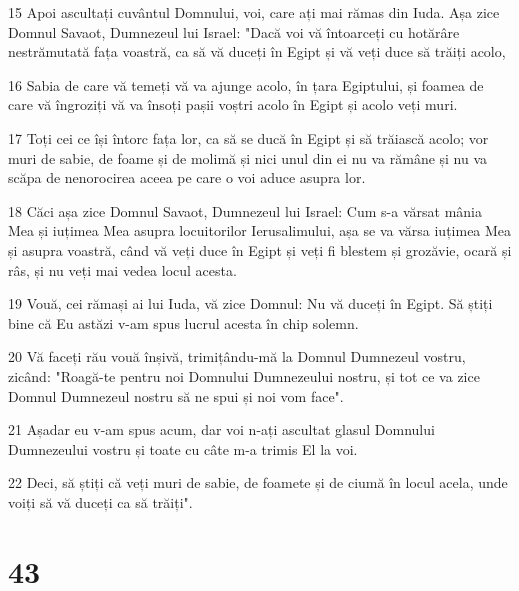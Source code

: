\par 15 Apoi ascultați cuvântul Domnului, voi, care ați mai rămas din Iuda. Așa zice Domnul Savaot, Dumnezeul lui Israel: "Dacă voi vă întoarceți cu hotărâre nestrămutată fața voastră, ca să vă duceți în Egipt și vă veți duce să trăiți acolo,
\par 16 Sabia de care vă temeți vă va ajunge acolo, în țara Egiptului, și foamea de care vă îngroziți vă va însoți pașii voștri acolo în Egipt și acolo veți muri.
\par 17 Toți cei ce își întorc fața lor, ca să se ducă în Egipt și să trăiască acolo; vor muri de sabie, de foame și de molimă și nici unul din ei nu va rămâne și nu va scăpa de nenorocirea aceea pe care o voi aduce asupra lor.
\par 18 Căci așa zice Domnul Savaot, Dumnezeul lui Israel: Cum s-a vărsat mânia Mea și iuțimea Mea asupra locuitorilor Ierusalimului, așa se va vărsa iuțimea Mea și asupra voastră, când vă veți duce în Egipt și veți fi blestem și grozăvie, ocară și râs, și nu veți mai vedea locul acesta.
\par 19 Vouă, cei rămași ai lui Iuda, vă zice Domnul: Nu vă duceți în Egipt. Să știți bine că Eu astăzi v-am spus lucrul acesta în chip solemn.
\par 20 Vă faceți rău vouă înșivă, trimițându-mă la Domnul Dumnezeul vostru, zicând: "Roagă-te pentru noi Domnului Dumnezeului nostru, și tot ce va zice Domnul Dumnezeul nostru să ne spui și noi vom face".
\par 21 Așadar eu v-am spus acum, dar voi n-ați ascultat glasul Domnului Dumnezeului vostru și toate cu câte m-a trimis El la voi.
\par 22 Deci, să știți că veți muri de sabie, de foamete și de ciumă în locul acela, unde voiți să vă duceți ca să trăiți".

\chapter{43}

